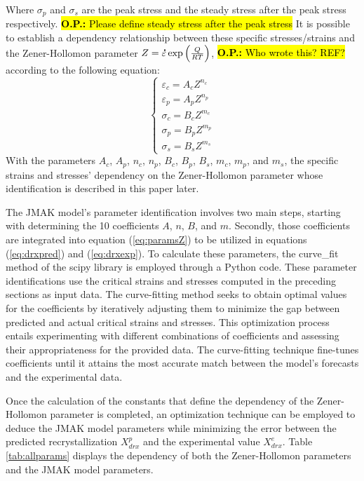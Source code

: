\documentclass[metals,article,submit,pdftex,moreauthors]{Definitions/mdpi}
\DeclareRobustCommand{\mdot}[1]{\accentset{\mbox{\bfseries .}}{#1}}
\DeclareRobustCommand{\OP}[1]{\begingroup\sethlcolor{VWyellow}\textcolor{red}{\hl{\textbf{O.P.:} #1}}\endgroup}
\begin{document}
Where $\sigma_p$ and $\sigma_s$ are the peak stress and the steady stress after the peak stress respectively. \OP{Please define steady stress after the peak stress}
It is possible to establish a dependency relationship between these specific stresses/strains and the Zener-Hollomon parameter $Z = \mdot\varepsilon \exp{\left(\frac{Q}{RT}\right)} \label{eq:ArZ}$, \OP{Who wrote this? REF?} according to the following equation:
\begin{equation}
\begin{cases}
\varepsilon_c = A_cZ^{n_c} \\ \varepsilon_p = A_pZ^{n_p} \\ \sigma_c = B_cZ^{m_c} \\ \sigma_p = B_pZ^{m_p}\\ \sigma_s = B_sZ^{m_s}
\end{cases}
\label{eq:paramsZ}
\end{equation}
With the parameters $A_c$, $A_p$, $n_c$, $n_p$, $B_c$, $B_p$, $B_s$, $m_c$, $m_p$, and $m_s$, the specific strains and stresses' dependency on the Zener-Hollomon parameter whose identification is described in this paper later.

The JMAK model's parameter identification involves two main steps, starting with determining the 10 coefficients $A$, $n$, $B$, and $m$.
Secondly, those coefficients are integrated into equation (\ref{eq:paramsZ}) to be utilized in equations (\ref{eq:drxpred}) and (\ref{eq:drxexp}).
To calculate these parameters, the curve\_fit method of the scipy library is employed through a Python code.
These parameter identifications use the critical strains and stresses computed in the preceding sections as input data.
The curve-fitting method seeks to obtain optimal values for the coefficients by iteratively adjusting them to minimize the gap between predicted and actual critical strains and stresses.
This optimization process entails experimenting with different combinations of coefficients and assessing their appropriateness for the provided data.
The curve-fitting technique fine-tunes coefficients until it attains the most accurate match between the model's forecasts and the experimental data.

Once the calculation of the constants that define the dependency of the Zener-Hollomon parameter is completed, an optimization technique can be employed to deduce the JMAK model parameters while minimizing the error between the predicted recrystallization $X_{drx}^{p}$ and the experimental value $X_{drx}^{e}$.
Table \ref{tab:allparams} displays the dependency of both the Zener-Hollomon parameters and the JMAK model parameters.
\end{document}
